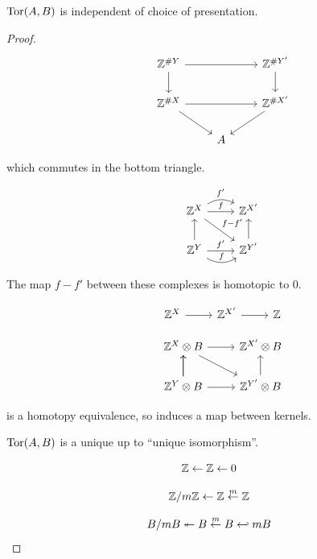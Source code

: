 \documentclass[11pt,leqno,oneside]{amsart}
\numberwithin{thm}{section}
\begin{document}
\begin{thm}
  $\operatorname{Tor}(A, B)$ is independent of choice of presentation.
\end{thm}
\begin{proof}
  $$\begin{tikzcd}
    & \Z^{\# Y} \arrow[rr, ""] \arrow[d, ""] &\, & \Z^{\# Y'} \arrow[d, ""] \\
    & \Z^{\# X} \arrow[rr, ""] \arrow[rd, ""] &\, & \Z^{\# X'} \arrow[dl, ""] \\
    &\, & A
  \end{tikzcd}$$

  which commutes in the bottom triangle.

  $$\begin{tikzcd}
    & \Z^X \arrow[r, "f"] \arrow[r, bend left, "f'"] \arrow[rd, "f-f'"] & \Z^{X'} \\
    & \Z^Y \arrow[r, bend right, "f"] \arrow[r, "f'"] \arrow[u, ""] & \Z^{Y'} \arrow[u, ""]
  \end{tikzcd}$$

  The map $f - f'$ between these complexes is homotopic to 0.

  $$\begin{tikzcd}
    & \Z^X \arrow[r, ""] & \Z^{X'} \arrow[r, ""] & \Z
  \end{tikzcd}$$

  $$\begin{tikzcd}
    & \Z^X \tprod B \arrow[r, ""] \arrow[rd, ""] & \Z^{X'} \tprod B \\
    & \Z^Y \tprod B \arrow[r, ""] \arrow[u, ""] \arrow[u, ""] & \Z^{Y'} \tprod B \arrow[u, ""]
  \end{tikzcd}$$

  is a homotopy equivalence, so induces a map between kernels.

  $\operatorname{Tor}(A, B)$ is a unique up to ``unique isomorphism''.

  $${\mathbb Z} \leftarrow {\mathbb Z} \leftarrow 0$$

  $${\mathbb Z}/m{\mathbb Z} \leftarrow {\mathbb Z} \overset{m}{\leftarrow} {\mathbb Z}$$

  $$B/mB \twoheadleftarrow B \overset{m}{\leftarrow} B \hookleftarrow mB$$
\end{proof}
\end{document}
